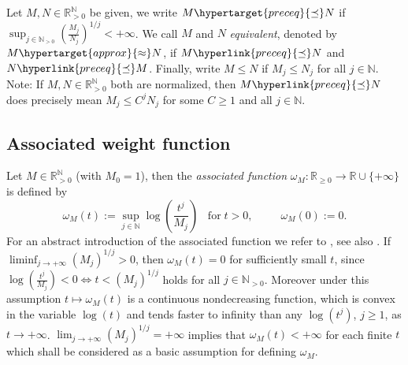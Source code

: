 \documentclass[10pt]{amsart}%
\numberwithin{equation}{section}
\theoremstyle{plain}
\newcommand{\RR}{\mathbb{R}}
\newcommand{\NN}{\mathbb{N}}
\begin{document}

Let $M,N\in\RR_{>0}^{\NN}$ be given, we write $M\hypertarget{preceq}{\preceq}N$ if $\sup_{j\in\NN_{>0}}\left(\frac{M_j}{N_j}\right)^{1/j}<+\infty$. We call $M$ and $N$ {\itshape equivalent}, denoted by $M\hypertarget{approx}{\approx}N$, if $M\hyperlink{preceq}{\preceq}N$ and $N\hyperlink{preceq}{\preceq}M$. Finally, write $M\le N$ if $M_j\le N_j$ for all $j\in\NN$. Note: If $M,N\in\RR_{>0}^{\NN}$ both are normalized, then $M\hyperlink{preceq}{\preceq}N$ does precisely mean $M_j\le C^jN_j$ for some $C\ge 1$ and all $j\in\NN$.

\subsection{Associated weight function}
Let $M\in\RR_{>0}^{\NN}$ (with $M_0=1$), then the {\itshape associated function} $\omega_M: \RR_{\ge 0}\rightarrow\RR\cup\{+\infty\}$ is defined by
\begin{equation*}\label{assofunc}
\omega_M(t):=\sup_{j\in\NN}\log\left(\frac{t^j}{M_j}\right)\;\;\;\text{for}\;t>0,\hspace{30pt}\omega_M(0):=0.
\end{equation*}
For an abstract introduction of the associated function we refer to \cite[Chapitre I]{mandelbrojtbook}, see also \cite[Definition 3.1]{Komatsu73}. If $\liminf_{j\rightarrow+\infty}(M_j)^{1/j}>0$, then $\omega_M(t)=0$ for sufficiently small $t$, since $\log\left(\frac{t^j}{M_j}\right)<0\Leftrightarrow t<(M_j)^{1/j}$ holds for all $j\in\NN_{>0}$. Moreover under this assumption $t\mapsto\omega_M(t)$ is a continuous nondecreasing function, which is convex in the variable $\log(t)$ and tends faster to infinity than any $\log(t^j)$, $j\ge 1$, as $t\rightarrow+\infty$. $\lim_{j\rightarrow+\infty}(M_j)^{1/j}=+\infty$ implies that $\omega_M(t)<+\infty$ for each finite $t$ which shall be considered as a basic assumption for defining $\omega_M$.\vspace{6pt}
\end{document}
